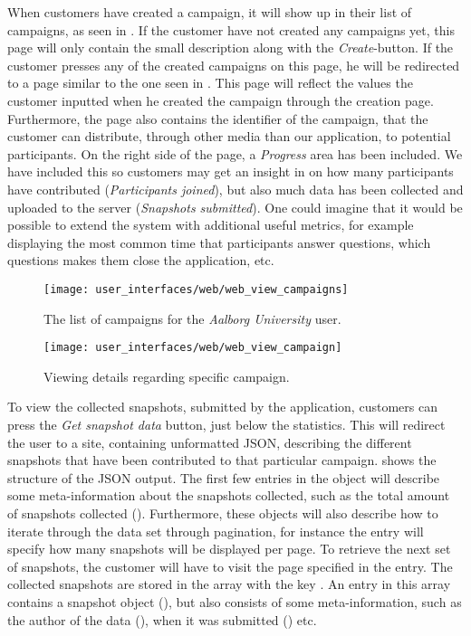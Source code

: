 When customers have created a campaign, it will show up in their list of campaigns, as seen in . If the customer have not created any campaigns yet, this page will only contain the small description along with the \emph{Create}-button. If the customer presses any of the created campaigns on this page, he will be redirected to a page similar to the one seen in . This page will reflect the values the customer inputted when he created the campaign through the creation page. Furthermore, the page also contains the identifier of the campaign, that the customer can distribute, through other media than our application, to potential participants. On the right side of the page, a \emph{Progress} area has been included. We have included this so customers may get an insight in on how many participants have contributed (\emph{Participants joined}), but also much data has been collected and uploaded to the server (\emph{Snapshots submitted}). One could imagine that it would be possible to extend the system with additional useful metrics, for example displaying the most common time that participants answer questions, which questions makes them close the application, etc. 

\begin{figure}[!htbp]
\centering
\texttt{[image: user\_interfaces/web/web\_view\_campaigns]}
\caption{The list of campaigns for the \emph{Aalborg University} user.}
\label{fig:web_view_campaigns}
\end{figure}
\FloatBarrier

\begin{figure}[!htbp]
\centering
\texttt{[image: user\_interfaces/web/web\_view\_campaign]}
\caption{Viewing details regarding specific campaign.}
\label{fig:web_view_campaign}
\end{figure}
\FloatBarrier

To view the collected snapshots, submitted by the application, customers can press the \emph{Get snapshot data} button, just below the statistics. This will redirect the user to a site, containing unformatted JSON, describing the different snapshots that have been contributed to that particular campaign.  shows the structure of the JSON output. The first few entries in the object will describe some meta-information about the snapshots collected, such as the total amount of snapshots collected (). Furthermore, these objects will also describe how to iterate through the data set through pagination, for instance the  entry will specify how many snapshots will be displayed per page. To retrieve the next set of snapshots, the customer will have to visit the page specified in the  entry. The collected snapshots are stored in the array with the key . An entry in this array contains a snapshot object (), but also consists of some meta-information, such as the author of the data (), when it was submitted () etc. 

